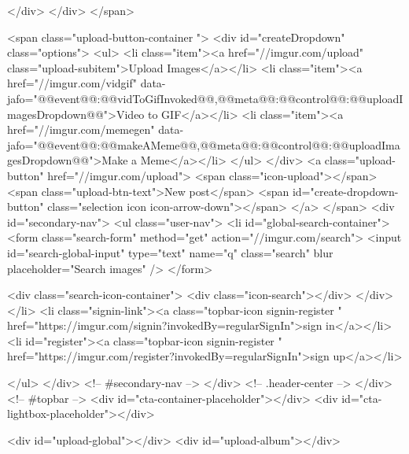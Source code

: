                 </div>
            </div>
        </span>
        
        <span class="upload-button-container ">
            <div id="createDropdown" class="options">
                <ul>
                    <li class="item"><a href="//imgur.com/upload" class="upload-subitem">Upload Images</a></li>
                    <li class="item"><a href="//imgur.com/vidgif" data-jafo="{@@event@@:@@vidToGifInvoked@@,@@meta@@:{@@control@@:@@uploadImagesDropdown@@}}">Video to GIF</a></li>
                    <li class="item"><a href="//imgur.com/memegen" data-jafo="{@@event@@:@@makeAMeme@@,@@meta@@:{@@control@@:@@uploadImagesDropdown@@}}">Make a Meme</a></li>
                </ul>
            </div>
            <a class="upload-button" href="//imgur.com/upload">
                <span class="icon-upload"></span>
                <span class="upload-btn-text">New post</span>
                <span id="create-dropdown-button" class="selection icon icon-arrow-down"></span>
            </a>
        </span>
        <div id="secondary-nav">
            <ul class="user-nav">
                <li id="global-search-container">
                    <form class="search-form" method="get" action="//imgur.com/search">
                        <input id="search-global-input" type="text" name="q" class="search" blur placeholder="Search images"  />
                    </form>

                    <div class="search-icon-container">
                        <div class="icon-search"></div>
                    </div>
                </li>
                                    <li class="signin-link"><a class="topbar-icon signin-register " href="https://imgur.com/signin?invokedBy=regularSignIn">sign in</a></li>
                    <li id="register"><a class="topbar-icon signin-register " href="https://imgur.com/register?invokedBy=regularSignIn">sign up</a></li>
                
            </ul>
        </div> <!-- #secondary-nav -->
    </div> <!-- .header-center -->
</div> <!-- #topbar -->
<div id="cta-container-placeholder"></div>
<div id="cta-lightbox-placeholder"></div>



        
    

    

            

        
    

        <div id="upload-global"></div>
    <div id="upload-album"></div>

